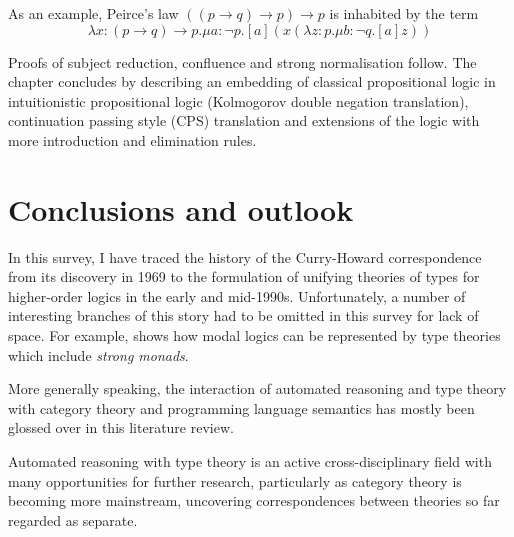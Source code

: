 \documentclass[12pt,toc=bibliography,numbers=noendperiod,
               footnotes=multiple,twoside]{scrartcl}
\begin{document}
As an example, Peirce's law \(((p \rightarrow q) \rightarrow p) \rightarrow p\) is inhabited by the term \[\lambda x:(p \rightarrow q) \rightarrow p.\mu a:\neg p.[a](x(\lambda z:p.\mu b:\neg q.[a]z))\]

Proofs of subject reduction, confluence and strong normalisation follow. The chapter concludes by describing an embedding of classical propositional logic in intuitionistic propositional logic (Kolmogorov double negation translation), continuation passing style (CPS) translation and extensions of the logic with more introduction and elimination rules.


\section{Conclusions and outlook}

In this survey, I have traced the history of the Curry-Howard correspondence from its discovery in 1969 to the formulation of unifying theories of types for higher-order logics in the early and mid-1990s. Unfortunately, a number of interesting branches of this story had to be omitted in this survey for lack of space. For example, \textcite{moggi_notions_1991} shows how modal logics can be represented by type theories which include \emph{strong monads}.

More generally speaking, the interaction of automated reasoning and type theory with category theory and programming language semantics has mostly been glossed over in this literature review.

Automated reasoning with type theory is an active cross-disciplinary field with many opportunities for further research, particularly as category theory is becoming more mainstream, uncovering correspondences between theories so far regarded as separate.

\printbibliography
\end{document}
